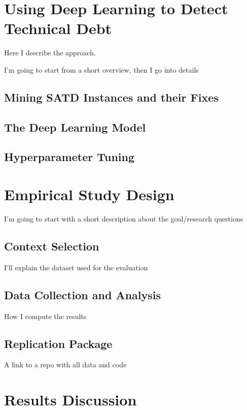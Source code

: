 \documentclass[11pt, mscthesis]{usiinfthesis}
\begin{document}
\chapter{Using Deep Learning to Detect Technical Debt}

Here I describe the approach. 

I'm going to start from a short overview, then I go into details

\section{Mining SATD Instances and their Fixes}


\section{The Deep Learning Model}

\section{Hyperparameter Tuning}


\chapter{Empirical Study Design}

I'm going to start with a short description  about the goal/research questions

\section{Context Selection}
I'll explain the dataset used for the evaluation


\section{Data Collection and Analysis}
How I compute the results


\section{Replication Package}
A link to a repo with all data and code




\chapter{Results Discussion}
\end{document}
